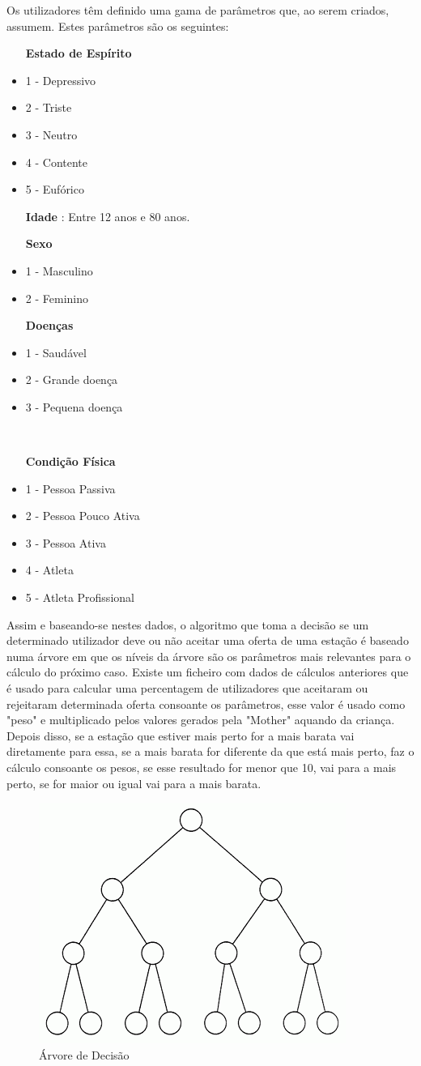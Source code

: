 Os utilizadores têm definido uma gama de parâmetros que, ao serem criados, assumem. Estes parâmetros são os seguintes:
\begin{itemize}
\item [\textbf{Estado de Espírito}]
	\item 1 - Depressivo
	\item 2 - Triste
	\item 3 - Neutro
	\item 4 - Contente
	\item 5 - Eufórico
	
\item [\textbf{Idade}]: Entre 12 anos e 80 anos.

\item [\textbf{Sexo}]
	\item 1 - Masculino
	\item 2 - Feminino

\newpage

\item [\textbf{Doenças}]
	\item 1 - Saudável
	\item 2 - Grande doença
	\item 3 - Pequena doença

\ \item [\textbf{Condição Física}]
	\item 1 - Pessoa Passiva
	\item 2 - Pessoa Pouco Ativa
	\item 3 - Pessoa Ativa
	\item 4 - Atleta
	\item 5 - Atleta Profissional
\end{itemize}
\vspace{5mm}
Assim e baseando-se nestes dados, o algoritmo que toma a decisão se um determinado utilizador deve ou não aceitar uma oferta de uma estação é baseado numa árvore em que os níveis da árvore são os parâmetros mais relevantes para o cálculo do próximo caso.
Existe um ficheiro com dados de cálculos anteriores que é usado para calcular uma percentagem de utilizadores que aceitaram ou rejeitaram determinada oferta consoante os parâmetros, esse valor é usado como "peso" e multiplicado pelos valores gerados pela "Mother" aquando da criança. Depois disso, se a estação que estiver mais perto for a mais barata vai diretamente para essa, se a mais barata for diferente da que está mais perto, faz o cálculo consoante os pesos, se esse resultado for menor que 10, vai para a mais perto, se for maior ou igual vai para a mais barata.

\begin{figure}[H]
    \centering
    \includegraphics[scale=0.8]{bin.png}
    \caption{Árvore de Decisão}
    \label{fig:Arvore}
\end{figure}